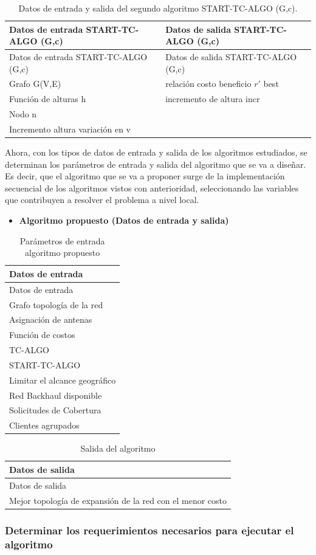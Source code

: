 \documentclass[]{article}
\providecommand{\tightlist}{%
  \setlength{\itemsep}{0pt}\setlength{\parskip}{0pt}}
\begin{document}
\begin{longtable}[]{@{}ll@{}}
\caption{Datos de entrada y salida del segundo algoritmo START-TC-ALGO
(G,c).}\tabularnewline
\toprule
Datos de entrada START-TC-ALGO (G,c) & Datos de salida START-TC-ALGO
(G,c)\tabularnewline
\midrule
\endfirsthead
\toprule
Datos de entrada START-TC-ALGO (G,c) & Datos de salida START-TC-ALGO
(G,c)\tabularnewline
\midrule
\endhead
Grafo G(V,E) & relación costo beneficio \(r'\) best\tabularnewline
Función de alturas h & incremento de altura incr\tabularnewline
Nodo n &\tabularnewline
Incremento altura variación en v &\tabularnewline
\bottomrule
\end{longtable}

Ahora, con los tipos de datos de entrada y salida de los algoritmos
estudiados, se determinan los parámetros de entrada y salida del
algoritmo que se va a diseñar. Es decir, que el algoritmo que se va a
proponer surge de la implementación secuencial de los algoritmos vistos
con anterioridad, seleccionando las variables que contribuyen a resolver
el problema a nivel local.

\begin{itemize}
\tightlist
\item
  \textbf{Algoritmo propuesto (Datos de entrada y salida)}
\end{itemize}

\begin{longtable}[]{@{}l@{}}
\caption{Parámetros de entrada algoritmo propuesto}\tabularnewline
\toprule
Datos de entrada\tabularnewline
\midrule
\endfirsthead
\toprule
Datos de entrada\tabularnewline
\midrule
\endhead
Grafo topología de la red\tabularnewline
Asignación de antenas\tabularnewline
Función de costos\tabularnewline
TC-ALGO\tabularnewline
START-TC-ALGO\tabularnewline
Limitar el alcance geográfico\tabularnewline
Red Backhaul disponible\tabularnewline
Solicitudes de Cobertura\tabularnewline
Clientes agrupados\tabularnewline
\bottomrule
\end{longtable}

\begin{longtable}[]{@{}l@{}}
\caption{Salida del algoritmo}\tabularnewline
\toprule
Datos de salida\tabularnewline
\midrule
\endfirsthead
\toprule
Datos de salida\tabularnewline
\midrule
\endhead
Mejor topología de expansión de la red con el menor costo\tabularnewline
\bottomrule
\end{longtable}

\subsubsection{Determinar los requerimientos necesarios para ejecutar el
algoritmo}\label{determinar-los-requerimientos-necesarios-para-ejecutar-el-algoritmo}
\end{document}
